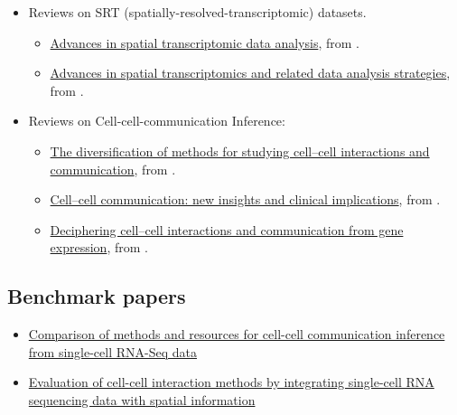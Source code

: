 \documentclass[
  letterpaper,
]{book}
\providecommand{\tightlist}{%
  \setlength{\itemsep}{0pt}\setlength{\parskip}{0pt}}\usepackage{longtable,booktabs,array}
\begin{document}
\begin{itemize}
\tightlist
\item
  Reviews on SRT (spatially-resolved-transcriptomic) datasets.

  \begin{itemize}
  \tightlist
  \item
    \href{https://pmc.ncbi.nlm.nih.gov/articles/PMC8494229/\#s4}{Advances
    in spatial transcriptomic data analysis}, from
    \textcite{dries2021gr}.
  \item
    \href{https://translational-medicine.biomedcentral.com/articles/10.1186/s12967-023-04150-2}{Advances
    in spatial transcriptomics and related data analysis strategies},
    from \textcite{du2023jotm}.
  \end{itemize}
\item
  Reviews on Cell-cell-communication Inference:

  \begin{itemize}
  \tightlist
  \item
    \href{https://www.nature.com/articles/s41576-023-00685-8}{The
    diversification of methods for studying cell--cell interactions and
    communication}, from \textcite{armingol2024nrg}.
  \item
    \href{https://www.nature.com/articles/s41392-024-01888-z}{Cell--cell
    communication: new insights and clinical implications}, from
    \textcite{su2024sttt}.
  \item
    \href{https://www.nature.com/articles/s41576-020-00292-x}{Deciphering
    cell--cell interactions and communication from gene expression},
    from \textcite{armingol2021nrg}.
  \end{itemize}
\end{itemize}

\subsection{Benchmark papers}\label{benchmark-papers}

\begin{itemize}
\tightlist
\item
  \href{https://www.nature.com/articles/s41467-022-30755-0}{Comparison
  of methods and resources for cell-cell communication inference from
  single-cell RNA-Seq data}
\item
  \href{https://genomebiology.biomedcentral.com/articles/10.1186/s13059-022-02783-y}{Evaluation
  of cell-cell interaction methods by integrating single-cell RNA
  sequencing data with spatial information}
\end{itemize}
\end{document}
